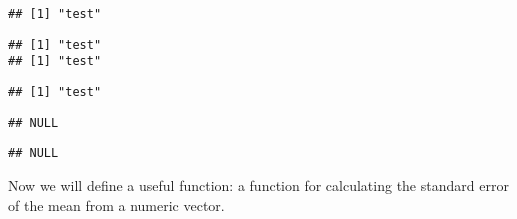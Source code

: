 \documentclass[paper=a4,headsepline,BCOR=12mm,twoside,open=right,%
titlepage,headings=small,fontsize=10pt,index=totoc,bibliography=totoc,%
captions=tableheading,captions=nooneline]{scrbook}\usepackage{knitr}
\begin{document}
\begin{knitrout}\footnotesize
{}\color{fgcolor}\begin{kframe}
\begin{alltt}
 \hlkwb{<-} \hlstd{(}\hlstd{)\{}
\hlstd{(}\hlstd{)}
\end{alltt}
\begin{verbatim}
## [1] "test"
\end{verbatim}
\begin{alltt}
 \hlkwb{<-} \hlstd{(}\hlstd{)\{} 
\hlstd{(}\hlstd{)}
\end{alltt}
\begin{verbatim}
## [1] "test"
## [1] "test"
\end{verbatim}
\begin{alltt}
 \hlkwb{<-} \hlstd{(}\hlstd{)\{} 
\hlstd{(}\hlstd{)}
\end{alltt}
\begin{verbatim}
## [1] "test"
\end{verbatim}
\begin{alltt}
 \hlkwb{<-} \hlstd{(}\hlstd{)\{}\hlstd{();} 
\hlstd{(}\hlstd{)}
\end{alltt}
\begin{verbatim}
## NULL
\end{verbatim}
\begin{alltt}
 \hlkwb{<-} \hlstd{(}
\hlstd{(}\hlstd{)}
\end{alltt}
\begin{verbatim}
## NULL
\end{verbatim}
\end{kframe}
\end{knitrout}

Now we will define a useful function: a function for calculating the standard error of the mean from a numeric vector.
\end{document}
